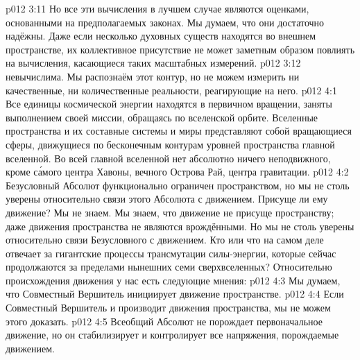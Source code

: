\vs p012 3:11 Но все эти вычисления в лучшем случае являются оценками, основанными на предполагаемых законах. Мы думаем, что они достаточно надёжны. Даже если несколько духовных существ находятся во внешнем пространстве, их коллективное присутствие не может заметным образом повлиять на вычисления, касающиеся таких масштабных измерений.
\vs p012 3:12 \pc {} невычислима. Мы распознаём этот контур, но не можем измерить ни качественные, ни количественные реальности, реагирующие на него.
\vs p012 4:1 Все единицы космической энергии находятся в первичном вращении, заняты выполнением своей миссии, обращаясь по вселенской орбите. Вселенные пространства и их составные системы и миры представляют собой вращающиеся сферы, движущиеся по бесконечным контурам уровней пространства главной вселенной. Во всей главной вселенной нет абсолютно ничего неподвижного, кроме с\'амого центра Хавоны, вечного Острова Рай, центра гравитации.
\vs p012 4:2 Безусловный Абсолют функционально ограничен пространством, но мы не столь уверены относительно связи этого Абсолюта с движением. Присуще ли ему движение? Мы не знаем. Мы знаем, что движение не присуще пространству; даже движения  пространства не являются врождёнными. Но мы не столь уверены относительно связи Безусловного с движением. Кто или что на самом деле отвечает за гигантские процессы трансмутации силы\hyp{}энергии, которые сейчас продолжаются за пределами нынешних семи сверхвселенных? Относительно происхождения движения у нас есть следующие мнения:
\vs p012 4:3 Мы думаем, что Совместный Вершитель инициирует движение  пространстве.
\vs p012 4:4 Если Совместный Вершитель и производит движения  пространства, мы не можем этого доказать.
\vs p012 4:5 Всеобщий Абсолют не порождает первоначальное движение, но он стабилизирует и контролирует все напряжения, порождаемые движением.
